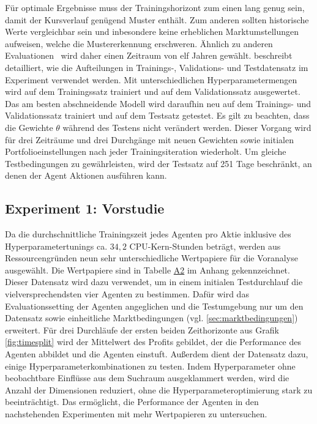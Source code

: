 Für optimale Ergebnisse muss der Trainingshorizont zum einen lang genug sein, damit der Kursverlauf genügend Muster enthält. Zum anderen sollten historische Werte vergleichbar sein und inbesondere keine erheblichen Marktumstellungen aufweisen, welche die Mustererkennung erschweren.
Ähnlich zu anderen Evaluationen~\parencite{théate2020application,zhang2019deep} wird daher einen Zeitraum von elf Jahren gewählt.
\parencite{lautenschlager} beschreibt detailliert, wie die Aufteilungen in Trainings-, Validations- und Testdatensatz im Experiment verwendet werden. 
Mit unterschiedlichen Hyperparametermengen wird auf dem Trainingssatz trainiert und auf dem Validationssatz ausgewertet. Das am besten abschneidende Modell wird daraufhin neu auf dem Trainings- und Validationssatz trainiert und auf dem Testsatz getestet. Es gilt zu beachten, dass die Gewichte $\theta$ während des Testens nicht verändert werden. Dieser Vorgang wird für drei Zeiträume und drei Durchgänge mit neuen Gewichten sowie initialen Portfolioeinstellungen nach jeder Trainingsiteration wiederholt. 
Um gleiche Testbedingungen zu gewährleisten, wird der Testsatz auf 251 Tage beschränkt, an denen der Agent Aktionen ausführen kann.

\subsection{Experiment 1: Vorstudie}
\label{subsec:voranalyse}
Da die durchschnittliche Trainingszeit jedes Agenten pro Aktie inklusive des Hyperparametertunings ca. $34,2$ CPU-Kern-Stunden beträgt, werden aus Ressourcengründen neun sehr unterschiedliche Wertpapiere für die Voranalyse ausgewählt. Die Wertpapiere sind in Tabelle \hyperref[tabe2]{A2} im Anhang gekennzeichnet.
Dieser Datensatz wird dazu verwendet, um in einem initialen Testdurchlauf die vielversprechendsten vier Agenten zu bestimmen. 
Dafür wird das Evaluationssetting der Agenten angeglichen und die Testumgebung nur um den Datensatz sowie einheitliche Marktbedingungen (vgl. \ref{sec:marktbedingungen}) erweitert. Für drei Durchläufe der ersten beiden Zeithorizonte aus Grafik \ref{fig:timesplit} wird der Mittelwert des Profits gebildet, der die Performance des Agenten abbildet und die Agenten einstuft. 
Außerdem dient der Datensatz dazu, einige Hyperparameterkombinationen zu testen. Indem Hyperparameter ohne beobachtbare Einflüsse aus dem Suchraum ausgeklammert werden, wird die Anzahl der Dimensionen reduziert, ohne die Hyperparameteroptimierung stark zu beeinträchtigt. Das ermöglicht, die Performance der Agenten in den nachstehenden Experimenten mit mehr Wertpapieren zu untersuchen.

